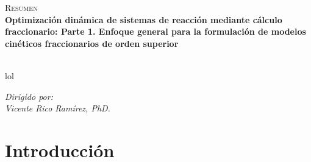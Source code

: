 \documentclass[12pt]{report}
\begin{document}
\restoregeometry
\thispagestyle{empty}
\begin{center}
\textsc{\Huge Resumen}\\[0.5cm]
\textbf{\large Optimización dinámica de sistemas de reacción mediante cálculo fraccionario: Parte 1. Enfoque general para la formulación de modelos cinéticos fraccionarios de orden superior}\\[0.25cm]
\\[0.5cm]
\end{center}

lol

\begin{flushright}
    \textit{\large Dirigido por:}\\
    \textit{\large Vicente Rico Ramírez, PhD.}
\end{flushright}


\restoregeometry
\tableofcontents

\newpage
{}
\chapter{Introducción}

\citet{NewmanGirvan2004}

\newpage


\end{document}
